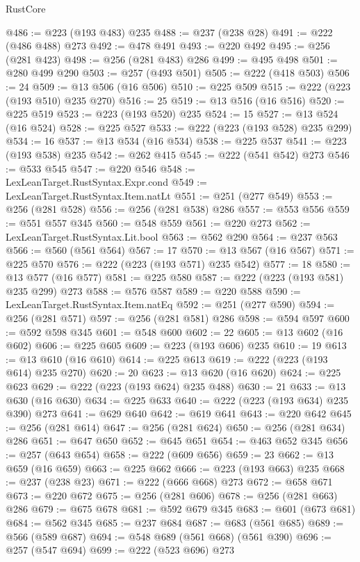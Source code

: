\begin{lexlean}{RustCore}
\begin{coremodule}
@486 := @223 (@193 @483) @235
@488 := @237 (@238 @28)
@491 := @222 (@486 @488) @273
@492 := @478 @491
@493 := @220 @492
@495 := @256 (@281 @423)
@498 := @256 (@281 @483) @286
@499 := @495 @498
@501 := @280 @499 @290
@503 := @257 (@493 @501)
@505 := @222 (@418 @503)
@506 := 24
@509 := @13 @506 (@16 @506)
@510 := @225 @509
@515 := @222 (@223 (@193 @510) @235 @270)
@516 := 25
@519 := @13 @516 (@16 @516)
@520 := @225 @519
@523 := @223 (@193 @520) @235
@524 := 15
@527 := @13 @524 (@16 @524)
@528 := @225 @527
@533 := @222 (@223 (@193 @528) @235 @299)
@534 := 16
@537 := @13 @534 (@16 @534)
@538 := @225 @537
@541 := @223 (@193 @538) @235
@542 := @262 @415
@545 := @222 (@541 @542) @273
@546 := @533 @545
@547 := @220 @546
@548 := LexLeanTarget.RustSyntax.Expr.cond
@549 := LexLeanTarget.RustSyntax.Item.natLt
@551 := @251 (@277 @549)
@553 := @256 (@281 @528)
@556 := @256 (@281 @538) @286
@557 := @553 @556
@559 := @551 @557 @345
@560 := @548 @559
@561 := @220 @273
@562 := LexLeanTarget.RustSyntax.Lit.bool
@563 := @562 @290
@564 := @237 @563
@566 := @560 (@561 @564)
@567 := 17
@570 := @13 @567 (@16 @567)
@571 := @225 @570
@576 := @222 (@223 (@193 @571) @235 @542)
@577 := 18
@580 := @13 @577 (@16 @577)
@581 := @225 @580
@587 := @222 (@223 (@193 @581) @235 @299) @273
@588 := @576 @587
@589 := @220 @588
@590 := LexLeanTarget.RustSyntax.Item.natEq
@592 := @251 (@277 @590)
@594 := @256 (@281 @571)
@597 := @256 (@281 @581) @286
@598 := @594 @597
@600 := @592 @598 @345
@601 := @548 @600
@602 := 22
@605 := @13 @602 (@16 @602)
@606 := @225 @605
@609 := @223 (@193 @606) @235
@610 := 19
@613 := @13 @610 (@16 @610)
@614 := @225 @613
@619 := @222 (@223 (@193 @614) @235 @270)
@620 := 20
@623 := @13 @620 (@16 @620)
@624 := @225 @623
@629 := @222 (@223 (@193 @624) @235 @488)
@630 := 21
@633 := @13 @630 (@16 @630)
@634 := @225 @633
@640 := @222 (@223 (@193 @634) @235 @390) @273
@641 := @629 @640
@642 := @619 @641
@643 := @220 @642
@645 := @256 (@281 @614)
@647 := @256 (@281 @624)
@650 := @256 (@281 @634) @286
@651 := @647 @650
@652 := @645 @651
@654 := @463 @652 @345
@656 := @257 (@643 @654)
@658 := @222 (@609 @656)
@659 := 23
@662 := @13 @659 (@16 @659)
@663 := @225 @662
@666 := @223 (@193 @663) @235
@668 := @237 (@238 @23)
@671 := @222 (@666 @668) @273
@672 := @658 @671
@673 := @220 @672
@675 := @256 (@281 @606)
@678 := @256 (@281 @663) @286
@679 := @675 @678
@681 := @592 @679 @345
@683 := @601 (@673 @681)
@684 := @562 @345
@685 := @237 @684
@687 := @683 (@561 @685)
@689 := @566 (@589 @687)
@694 := @548 @689 (@561 @668) (@561 @390)
@696 := @257 (@547 @694)
@699 := @222 (@523 @696) @273

\end{coremodule}
\end{lexlean}
